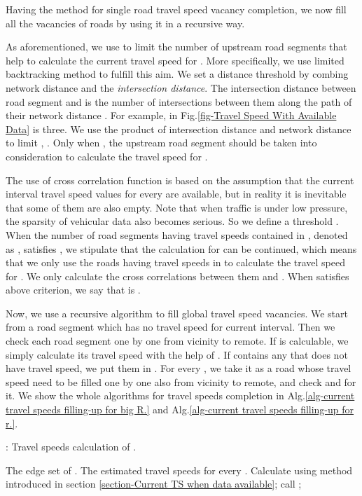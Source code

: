 \documentclass[twocolumn,10pt,final,conference]{IEEEtran}
\begin{document}
Having the method for single road travel speed vacancy completion, we now fill all the vacancies of roads by using it in a recursive way.

As aforementioned, we use  to limit the number of upstream road segments that help to calculate the current travel speed for . More specifically, we use limited backtracking method to fulfill this aim. We set a distance threshold  by combing network distance  and the \emph{intersection distance}.
The intersection distance  between road segment  and  is the number of intersections between them along the path of their network distance . For example,  in Fig.\ref{fig-Travel Speed With Available Data} is three.
We use the product of intersection distance and network distance to limit , . Only when , the upstream road segment  should be taken into consideration to calculate the travel speed for .


The use of cross correlation function is based on the assumption that the current interval travel speed values for every  are available, but in reality it is inevitable that some of them are also empty. Note that when traffic is under low pressure, the sparsity of vehicular data also becomes serious. So we define a threshold . When the number of road segments having travel speeds contained in , denoted as , satisfies , we stipulate that the calculation for  can be continued, which means that we only use the roads having travel speeds in  to calculate the travel speed for . We only calculate the cross correlations between them and . When  satisfies above criterion, we say that  is .

Now, we use a recursive algorithm to fill global travel speed vacancies.
We start from a road segment  which has no travel speed for current interval. Then we check each road segment  one by one from vicinity to remote.
If  is calculable, we simply calculate its travel speed with the help of . If  contains any  that does not have travel speed, we put them in . For every , we take it as a road whose travel speed need to be filled one by one also from vicinity to remote, and check  and  for it. We show the whole algorithms for travel speeds completion in Alg.\ref{alg-current travel speeds filling-up for big R.} and Alg.\ref{alg-current travel speeds filling-up for r.}.


\begin{algorithm}[h]
\small
\caption{: Travel speeds calculation of .}
\label{alg-current travel speeds filling-up for big R.}
\begin{algorithmic}
\REQUIRE The edge set  of .
\ENSURE  The estimated travel speeds  for every .
 \STATE Calculate  using method introduced in section \ref{section-Current TS when data available};
 \ELSE
 \STATE call ;
 \ENDIF
\ENDIF
\ENDFOR
\end{algorithmic}
\end{algorithm}
\end{document}
